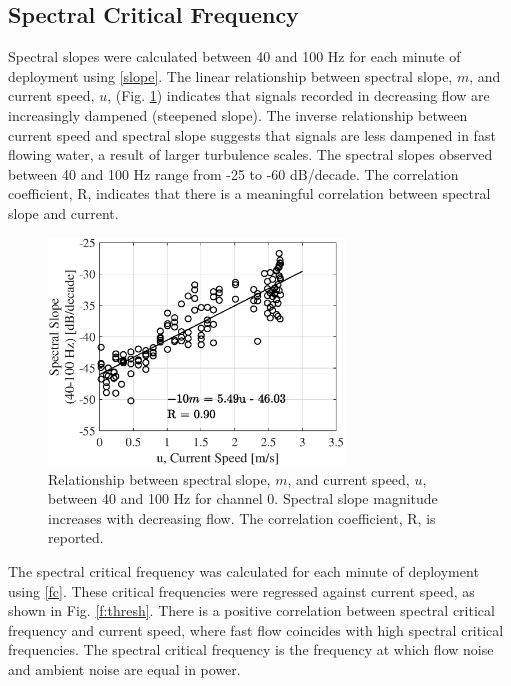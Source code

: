 \documentclass[12pt,journal,onecolumn]{IEEEtran}
\begin{document}
\subsection{Spectral Critical Frequency}
Spectral slopes were calculated between 40 and 100 Hz for each minute of deployment using \eqref{slope}. The linear relationship between spectral slope, $m$, and current speed, $u$, (Fig. \ref{f:slopes}) indicates that signals recorded in decreasing flow are increasingly dampened (steepened slope). The inverse relationship between current speed and spectral slope suggests that signals are less dampened in fast flowing water, a result of larger turbulence scales. The spectral slopes observed between 40 and 100 Hz range from -25 to -60 dB/decade. The correlation coefficient, R, indicates that there is a meaningful correlation between spectral slope and current.
\begin{figure}[!t]
	\begin{center}
		\includegraphics[width=0.7\textwidth]{figure3.eps} %
	\end{center}%
	\caption[Spectral slope current speed dependence]{
	\label{f:slopes}
	Relationship between spectral slope, $m$, and current speed, $u$, between 40 and 100 Hz for channel 0. Spectral slope magnitude increases with decreasing flow. The correlation coefficient, R, is reported. }
\end{figure}

The spectral critical frequency was calculated for each minute of deployment using \eqref{fc}. These critical frequencies were regressed against current speed, as shown in Fig. \ref{f:thresh}. There is a positive correlation between spectral critical frequency and current speed, where fast flow coincides with high spectral critical frequencies. The spectral critical frequency is the frequency at which flow noise and ambient noise are equal in power. 
\end{document}
